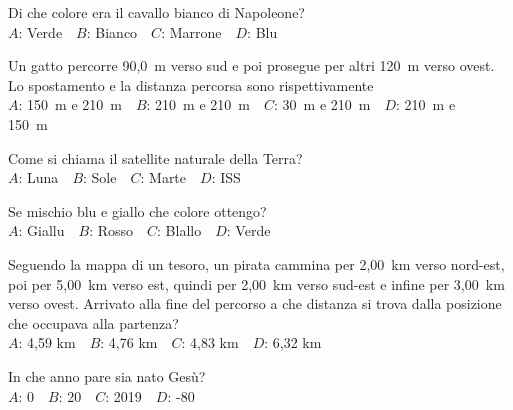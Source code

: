 \mcquestionfooter



\def\mcquestionnumber{12}


\mcquestionheader Di che colore era il cavallo bianco di Napoleone?\\
{$A$}: Verde\ \ {$B$}: Bianco\ \ {$C$}: Marrone\ \ {$D$}: Blu\ \ 

\mcquestionfooter



\mcpaperfooter

\def\mcserialnumber{15}
\mcpaperheader


\def\mcquestionnumber{1}


\mcquestionheader Un gatto percorre 90,0~m verso sud e poi prosegue per altri 120~m verso ovest. Lo spostamento e la distanza percorsa sono rispettivamente\\
{$A$}: 150~m e 210~m\ \ {$B$}: 210~m e 210~m\ \ {$C$}: 30~m e 210~m\ \ {$D$}: 210~m e 150~m\ \ 

\mcquestionfooter



\def\mcquestionnumber{2}


\mcquestionheader Come si chiama il satellite naturale della Terra?\\
{$A$}: Luna\ \ {$B$}: Sole\ \ {$C$}: Marte\ \ {$D$}: ISS\ \ 

\mcquestionfooter



\def\mcquestionnumber{3}


\mcquestionheader Se mischio blu e giallo che colore ottengo?\\
{$A$}: Giallu\ \ {$B$}: Rosso\ \ {$C$}: Blallo\ \ {$D$}: Verde\ \ 

\mcquestionfooter



\def\mcquestionnumber{4}


\mcquestionheader Seguendo la mappa di un tesoro, un pirata cammina per 2,00~km verso nord-est, poi per 5,00~km verso est, quindi per 2,00~km verso sud-est e infine per 3,00~km verso ovest. Arrivato alla fine del percorso a che distanza si trova dalla posizione che occupava alla partenza?\\
{$A$}: 4,59 km\ \ {$B$}: 4,76 km\ \ {$C$}: 4,83 km\ \ {$D$}: 6,32 km\ \ 

\mcquestionfooter



\def\mcquestionnumber{5}


\mcquestionheader In che anno pare sia nato Gesù?\\
{$A$}: 0\ \ {$B$}: 20\ \ {$C$}: 2019\ \ {$D$}: -80\ \ 

